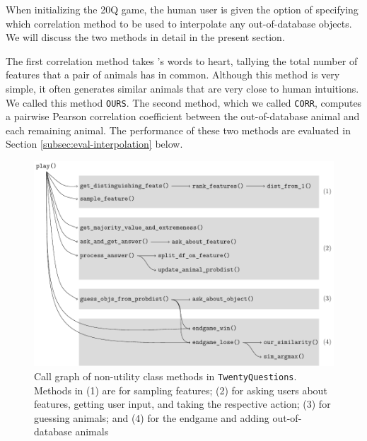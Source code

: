 \documentclass[11pt,a4paper]{article}
\begin{document}
When initializing the 20Q game, the human user is given the option of specifying which correlation method to be used to interpolate any out-of-database objects. We will discuss the two methods in detail in the present section.

The first correlation method takes \citeauthor{Rosch1978}'s \citeyearpar{Rosch1978} words to heart, tallying the total number of features that a pair of animals has in common. Although this method is very simple, it often generates similar animals that are very close to human intuitions. We called this method \texttt{OURS}. 
The second method, which we called \texttt{CORR}, computes a pairwise Pearson correlation coefficient between the out-of-database animal and each remaining animal. 
The performance of these two methods are evaluated in Section \ref{subsec:eval-interpolation} below.

\begin{figure}[htbp!]
\centering
	\includegraphics[width=.9\linewidth]{graphics/call_graph.pdf}
	\caption{Call graph of non-utility class methods in \texttt{TwentyQuestions}. Methods in (1) are for sampling features; (2) for asking users about features, getting user input, and taking the respective action; (3) for guessing animals; and (4) for the endgame and adding out-of-database animals}
	\label{fig:call-graph}
\end{figure}
\end{document}
